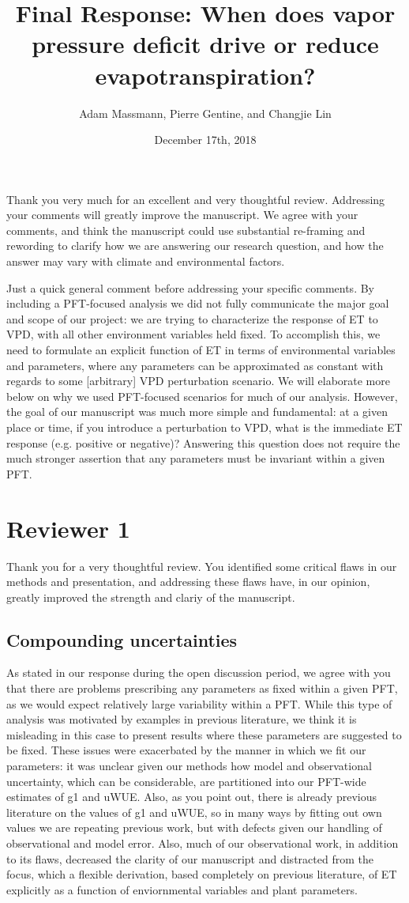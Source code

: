 \documentclass[12pt]{article}
\title{Final Response: When does vapor pressure deficit drive or
  reduce evapotranspiration?}
\author{Adam Massmann, Pierre Gentine, and Changjie Lin}
\date{December 17th, 2018}
\begin{document}
Thank you very much for an excellent and very thoughtful
review. Addressing your comments will greatly improve the
manuscript. We agree with your comments, and think the manuscript
could use substantial re-framing and rewording to clarify how we are
answering our research question, and how the answer may vary with
climate and environmental factors.

Just a quick general comment before addressing your specific
comments. By including a PFT-focused analysis we did not fully
communicate the major goal and scope of our project: we are trying to
characterize the response of ET to VPD, with all other environment
variables held fixed. To accomplish this, we need to formulate an
explicit function of ET in terms of environmental variables and
parameters, where any parameters can be approximated as constant with
regards to some [arbitrary] VPD perturbation scenario. We will
elaborate more below on why we used PFT-focused scenarios for much of
our analysis. However, the goal of our manuscript was much more simple
and fundamental: at a given place or time, if you introduce a
perturbation to VPD, what is the immediate ET response (e.g. positive
or negative)? Answering this question does not require the much
stronger assertion that any parameters must be invariant within a
given PFT.

\section{Reviewer 1}

Thank you for a very thoughtful review. You identified some critical
flaws in our methods and presentation, and addressing these flaws
have, in our opinion, greatly improved the strength and clariy of the
manuscript.

\subsection{Compounding uncertainties}

As stated in our response during the open discussion period, we agree
with you that there are problems prescribing any parameters as fixed
within a given PFT, as we would expect relatively large variability
within a PFT. While this type of analysis was motivated by examples in
previous literature, we think it is misleading in this case to present
results where these parameters are suggested to be fixed. These issues
were exacerbated by the manner in which we fit our parameters: it was
unclear given our methods how model and observational uncertainty,
which can be considerable, are partitioned into our PFT-wide estimates
of g1 and uWUE. Also, as you point out, there is already previous
literature on the values of g1 and uWUE, so in many ways by fitting
out own values we are repeating previous work, but with defects given
our handling of observational and model error. Also, much of our
observational work, in addition to its flaws, decreased the clarity of
our manuscript and distracted from the focus, which a flexible
derivation, based completely on previous literature, of ET explicitly
as a function of enviornmental variables and plant parameters.
\end{document}
